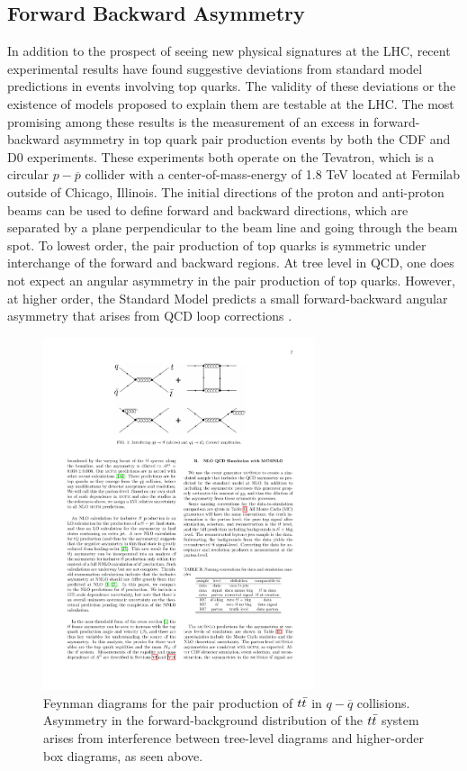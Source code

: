 \subsection{Forward Backward Asymmetry}

In addition to the prospect of seeing new physical signatures at the LHC,
recent experimental results have found suggestive deviations from standard model predictions in events involving top quarks.
The validity of these deviations or the existence of models proposed to explain them are testable at the LHC.
The most promising among these results is the measurement of an excess in forward-backward asymmetry in top quark pair production events by both the CDF and D0 experiments.
These experiments both operate on the Tevatron, which is a circular $p-\overline{p}$ collider with a center-of-mass-energy of 1.8 TeV located at Fermilab outside of Chicago, Illinois.
The initial directions of the proton and anti-proton beams can be used to define forward and backward directions,
which are separated by a plane perpendicular to the beam line and going through the beam spot.
To lowest order, the pair production of top quarks is symmetric under interchange of the forward and backward regions.
At tree level in QCD, one does not expect an angular asymmetry in the pair production of top quarks.
However, at higher order, the Standard Model predicts a small forward-backward angular asymmetry that arises from QCD loop corrections \cite{Aaltonen:1318520}.
\begin{figure}
  \begin{center}
    \includegraphics[width=80mm]{figures/theory/ttbarForwardBackwardFeynman}
  \end{center}
  \caption{Feynman diagrams for the pair production of $t\bar{t}$ in $q-\overline{q}$ collisions.  Asymmetry in the forward-background distribution of the $t\bar{t}$ system arises from interference between tree-level diagrams and higher-order box diagrams, as seen above.}
  \label{img:ForwardBackwardFeynman}
\end{figure}
